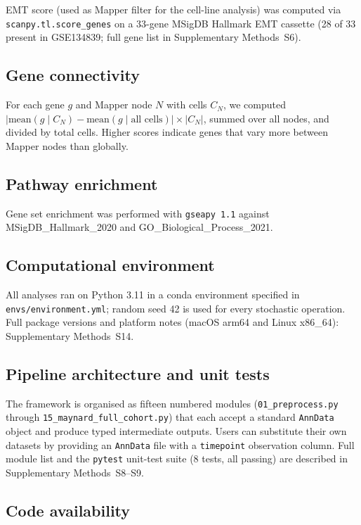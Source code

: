EMT score (used as Mapper filter for the cell-line analysis) was
computed via \texttt{scanpy.tl.score\_genes} on a 33-gene MSigDB
Hallmark EMT cassette (28 of 33 present in GSE134839; full gene list
in Supplementary Methods~S6).

\subsection*{Gene connectivity}

For each gene $g$ and Mapper node $N$ with cells $C_N$, we computed
$|\text{mean}(g \mid C_N) - \text{mean}(g \mid \text{all cells})|
\times |C_N|$, summed over all nodes, and divided by total cells.
Higher scores indicate genes that vary more between Mapper nodes than
globally.

\subsection*{Pathway enrichment}

Gene set enrichment was performed with \texttt{gseapy 1.1} against
MSigDB\_Hallmark\_2020 and GO\_Biological\_Process\_2021.

\subsection*{Computational environment}

All analyses ran on Python 3.11 in a conda environment specified in
\texttt{envs/environment.yml}; random seed 42 is used for every
stochastic operation. Full package versions and platform notes
(macOS arm64 and Linux x86\_64): Supplementary Methods~S14.

\subsection*{Pipeline architecture and unit tests}

The framework is organised as fifteen numbered modules
(\texttt{01\_preprocess.py} through \texttt{15\_maynard\_full\_cohort.py})
that each accept a standard \texttt{AnnData} object and produce typed
intermediate outputs. Users can substitute their own datasets by
providing an \texttt{AnnData} file with a \texttt{timepoint}
observation column. Full module list and the \texttt{pytest} unit-test
suite (8 tests, all passing) are described in Supplementary
Methods~S8--S9.

\subsection*{Code availability}

